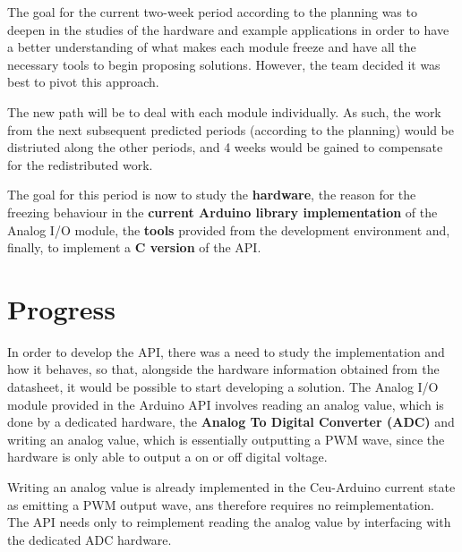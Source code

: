 \documentclass{article}
\begin{document}
\tab The goal for the current two-week period according to the planning was to deepen in the studies of the hardware and example applications in order to have a better understanding of what makes each module freeze and have all the necessary tools to begin proposing solutions. However, the team decided it was best to pivot this approach.
\par The new path will be to deal with each module individually. As such, the work from the next subsequent predicted periods (according to the planning) would be distriuted along the other periods, and 4 weeks would be gained to compensate for the redistributed work.
\par The goal for this period is now to study the \textbf{hardware}, the reason for the freezing behaviour in the \textbf{current Arduino library implementation} of the Analog I/O module, the \textbf{tools} provided from the development environment and, finally, to implement a \textbf{C version} of the API.

\section{Progress}
\tab In order to develop the API, there was a need to study the implementation and how it behaves, so that, alongside the hardware information obtained from the datasheet, it would be possible to start developing a solution. The Analog I/O module provided in the Arduino API involves reading an analog value, which is done by a dedicated hardware, the \textbf{Analog To Digital Converter (ADC)} and writing an analog value, which is essentially outputting a PWM wave, since the hardware is only able to output a on or off digital voltage.
\par Writing an analog value is already implemented in the Ceu-Arduino current state as emitting a PWM output wave, ans therefore requires no reimplementation. The API needs only to reimplement reading the analog value by interfacing with the dedicated ADC hardware.
\end{document}
